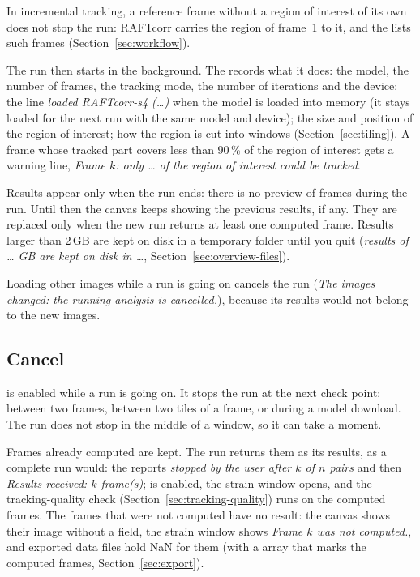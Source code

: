 In incremental tracking, a reference frame without a region of interest of its own does not stop
the run: RAFTcorr carries the region of frame~1 to it, and the  lists such frames
(Section~\ref{sec:workflow}).

The run then starts in the background. The  records what it does: the model, the number
of frames, the tracking mode, the number of iterations and the device; the line \emph{loaded
RAFTcorr-s4 (\ldots)} when the model is loaded into memory (it stays loaded for the next run with
the same model and device); the size and position of the region of interest; how the region is
cut into windows (Section~\ref{sec:tiling}). A frame whose tracked part covers less
than 90\,\% of the region of interest gets a warning line, \emph{Frame $k$: only \ldots{} of the
region of interest could be tracked}.

Results appear only when the run ends: there is no preview of frames during the run. Until then
the canvas keeps showing the previous results, if any. They are replaced only when the new run
returns at least one computed frame. Results larger than 2\,GB are kept on disk in a temporary
folder until you quit (\emph{results of \ldots{} GB are kept on disk in \ldots},
Section~\ref{sec:overview-files}).

Loading other images while a run is going on cancels the run (\emph{The images changed: the
running analysis is cancelled.}), because its results would not belong to the new images.

\subsection{Cancel}

 is enabled while a run is going on. It stops the run at the next check point:
between two frames, between two tiles of a frame, or during a model download. The run does not
stop in the middle of a window, so it can take a moment.

Frames already computed are kept. The run returns them as its results, as a complete run would:
the  reports \emph{stopped by the user after $k$ of $n$ pairs} and then \emph{Results
received: $k$ frame(s)};  is enabled, the strain window opens, and the
tracking-quality check (Section~\ref{sec:tracking-quality}) runs on the computed frames. The
frames that were not computed have no result: the canvas shows their image without a field, the
strain window shows \emph{Frame $k$ was not computed.}, and exported data files hold NaN for them
(with a  array that marks the computed frames, Section~\ref{sec:export}).

